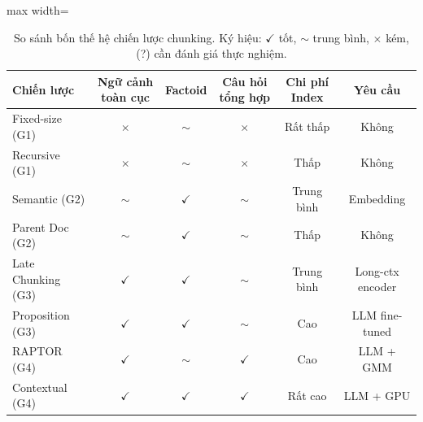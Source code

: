\documentclass[12pt,a4paper]{report}
\theoremstyle{plain}
\theoremstyle{definition}
\begin{document}
	\begin{table}[htbp]
		\centering
		\caption{So sánh bốn thế hệ chiến lược chunking. Ký hiệu: $\checkmark$ tốt,
			$\sim$ trung bình, $\times$ kém, (?) cần đánh giá thực nghiệm.}
		\label{tab:chunking_comparison_full}
		\begin{adjustbox}{max width=\linewidth}
			\begin{tabular}{lccccc}
				\toprule
				\textbf{Chiến lược}
				& \textbf{Ngữ cảnh toàn cục}
				& \textbf{Factoid}
				& \textbf{Câu hỏi tổng hợp}
				& \textbf{Chi phí Index}
				& \textbf{Yêu cầu} \\
				\midrule
				Fixed-size (G1)      & $\times$     & $\sim$     & $\times$     & Rất thấp & Không \\
				Recursive (G1)       & $\times$     & $\sim$     & $\times$     & Thấp     & Không \\
				Semantic (G2)        & $\sim$       & $\checkmark$ & $\sim$     & Trung bình & Embedding \\
				Parent Doc (G2)      & $\sim$       & $\checkmark$ & $\sim$     & Thấp     & Không \\
				Late Chunking (G3)   & $\checkmark$ & $\checkmark$ & $\sim$     & Trung bình & Long-ctx encoder \\
				Proposition (G3)     & $\checkmark$ & $\checkmark$ & $\sim$     & Cao      & LLM fine-tuned \\
				RAPTOR (G4)          & $\checkmark$ & $\sim$     & $\checkmark$ & Cao      & LLM + GMM \\
				Contextual (G4)      & $\checkmark$ & $\checkmark$ & $\checkmark$ & Rất cao & LLM + GPU \\
				\bottomrule
			\end{tabular}
		\end{adjustbox}
	\end{table}
	
\end{document}
